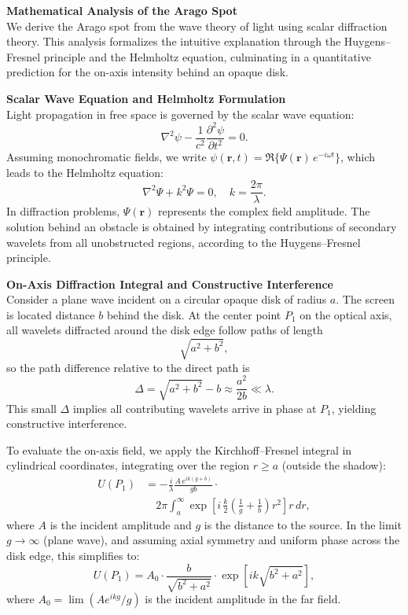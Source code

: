 \begin{technical}
{\Large\textbf{Mathematical Analysis of the Arago Spot}}\\[0.7em]

We derive the Arago spot from the wave theory of light using scalar diffraction theory. This analysis formalizes the intuitive explanation through the Huygens–Fresnel principle and the Helmholtz equation, culminating in a quantitative prediction for the on-axis intensity behind an opaque disk.

\noindent\textbf{Scalar Wave Equation and Helmholtz Formulation}\\[0.5em]
Light propagation in free space is governed by the scalar wave equation:
\[
\nabla^2 \psi - \frac{1}{c^2} \frac{\partial^2 \psi}{\partial t^2} = 0.
\]
Assuming monochromatic fields, we write $\psi(\mathbf{r},t) = \Re\{\Psi(\mathbf{r})\,e^{-i\omega t}\}$, which leads to the Helmholtz equation:
\[
\nabla^2 \Psi + k^2 \Psi = 0, \quad k = \frac{2\pi}{\lambda}.
\]
In diffraction problems, $\Psi(\mathbf{r})$ represents the complex field amplitude. The solution behind an obstacle is obtained by integrating contributions of secondary wavelets from all unobstructed regions, according to the Huygens–Fresnel principle.

\noindent\textbf{On-Axis Diffraction Integral and Constructive Interference}\\[0.5em]
Consider a plane wave incident on a circular opaque disk of radius $a$. The screen is located distance $b$ behind the disk. At the center point $P_1$ on the optical axis, all wavelets diffracted around the disk edge follow paths of length
\[
\sqrt{a^2 + b^2},
\]
so the path difference relative to the direct path is
\[
\Delta = \sqrt{a^2 + b^2} - b \approx \frac{a^2}{2b} \ll \lambda.
\]
This small $\Delta$ implies all contributing wavelets arrive in phase at $P_1$, yielding constructive interference.

To evaluate the on-axis field, we apply the Kirchhoff–Fresnel integral in cylindrical coordinates, integrating over the region $r \ge a$ (outside the shadow):
\begin{align}
U(P_1) &= -\frac{i}{\lambda} \frac{A\,e^{ik(g+b)}}{gb} \cdot \\
&\quad 2\pi \int_{a}^{\infty} \exp\left[ i\,\frac{k}{2} \left(\frac{1}{g} + \frac{1}{b}\right) r^2 \right] r\,dr, 
\end{align}
where $A$ is the incident amplitude and $g$ is the distance to the source. In the limit $g \to \infty$ (plane wave), and assuming axial symmetry and uniform phase across the disk edge, this simplifies to:
\[
U(P_1) = A_0 \cdot \frac{b}{\sqrt{b^2 + a^2}} \cdot \exp\left[ ik\sqrt{b^2 + a^2} \right],
\]
where $A_0 = \lim (A e^{ikg} / g)$ is the incident amplitude in the far field.


\end{technical}
